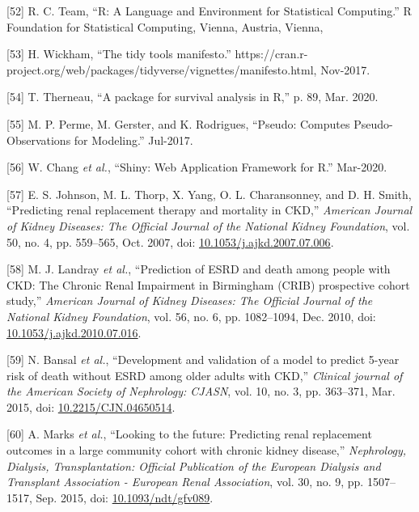 \documentclass[12pt,PhD,twoside,openright]{muthesis}
\newenvironment{cslreferences}%
  {}%
  {\par}
\begin{document}
\begin{cslreferences}
\leavevmode\hypertarget{ref-r_core_team_r_nodate}{}%
{[}52{]} R. C. Team, ``R: A Language and Environment for Statistical Computing.'' R Foundation for Statistical Computing, Vienna, Austria, Vienna,

\leavevmode\hypertarget{ref-wickham_tidy_2017}{}%
{[}53{]} H. Wickham, ``The tidy tools manifesto.'' https://cran.r-project.org/web/packages/tidyverse/vignettes/manifesto.html, Nov-2017.

\leavevmode\hypertarget{ref-therneau_package_2020}{}%
{[}54{]} T. Therneau, ``A package for survival analysis in R,'' p. 89, Mar. 2020.

\leavevmode\hypertarget{ref-perme_pseudo_2017}{}%
{[}55{]} M. P. Perme, M. Gerster, and K. Rodrigues, ``Pseudo: Computes Pseudo-Observations for Modeling.'' Jul-2017.

\leavevmode\hypertarget{ref-chang_shiny_2020}{}%
{[}56{]} W. Chang \emph{et al.}, ``Shiny: Web Application Framework for R.'' Mar-2020.

\leavevmode\hypertarget{ref-johnson_predicting_2007}{}%
{[}57{]} E. S. Johnson, M. L. Thorp, X. Yang, O. L. Charansonney, and D. H. Smith, ``Predicting renal replacement therapy and mortality in CKD,'' \emph{American Journal of Kidney Diseases: The Official Journal of the National Kidney Foundation}, vol. 50, no. 4, pp. 559--565, Oct. 2007, doi: \href{https://doi.org/10.1053/j.ajkd.2007.07.006}{10.1053/j.ajkd.2007.07.006}.

\leavevmode\hypertarget{ref-landray_prediction_2010}{}%
{[}58{]} M. J. Landray \emph{et al.}, ``Prediction of ESRD and death among people with CKD: The Chronic Renal Impairment in Birmingham (CRIB) prospective cohort study,'' \emph{American Journal of Kidney Diseases: The Official Journal of the National Kidney Foundation}, vol. 56, no. 6, pp. 1082--1094, Dec. 2010, doi: \href{https://doi.org/10.1053/j.ajkd.2010.07.016}{10.1053/j.ajkd.2010.07.016}.

\leavevmode\hypertarget{ref-bansal_development_2015}{}%
{[}59{]} N. Bansal \emph{et al.}, ``Development and validation of a model to predict 5-year risk of death without ESRD among older adults with CKD,'' \emph{Clinical journal of the American Society of Nephrology: CJASN}, vol. 10, no. 3, pp. 363--371, Mar. 2015, doi: \href{https://doi.org/10.2215/CJN.04650514}{10.2215/CJN.04650514}.

\leavevmode\hypertarget{ref-marks_looking_2015}{}%
{[}60{]} A. Marks \emph{et al.}, ``Looking to the future: Predicting renal replacement outcomes in a large community cohort with chronic kidney disease,'' \emph{Nephrology, Dialysis, Transplantation: Official Publication of the European Dialysis and Transplant Association - European Renal Association}, vol. 30, no. 9, pp. 1507--1517, Sep. 2015, doi: \href{https://doi.org/10.1093/ndt/gfv089}{10.1093/ndt/gfv089}.


\end{cslreferences}
\end{document}
